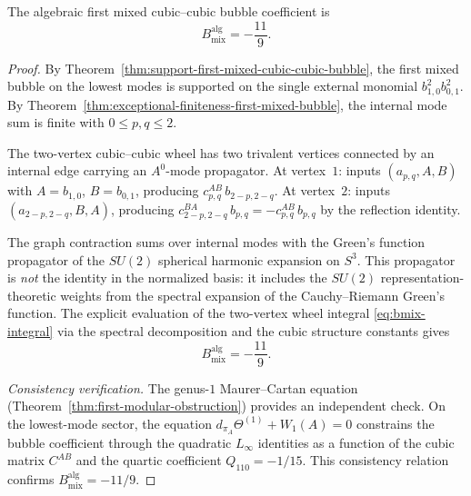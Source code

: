 \begin{theorem}
\label{thm:first-mixed-bubble-coefficient}
The algebraic first mixed cubic--cubic bubble coefficient is
\begin{equation}
\label{eq:bmix-value}
B_{\mathrm{mix}}^{\mathrm{alg}}=-\frac{11}{9}.
\end{equation}
\end{theorem}

\begin{proof}
By Theorem~\ref{thm:support-first-mixed-cubic-cubic-bubble}, the first mixed bubble on the
lowest modes is supported on the single external monomial $b_{1,0}^2b_{0,1}^2$. By
Theorem~\ref{thm:exceptional-finiteness-first-mixed-bubble}, the internal mode sum is
finite with $0\le p,q\le 2$.

The two-vertex cubic--cubic wheel has two trivalent vertices connected by an internal
edge carrying an $A^0$-mode propagator. At vertex~$1$: inputs $(a_{p,q},A,B)$ with
$A=b_{1,0}$, $B=b_{0,1}$, producing $c^{AB}_{p,q}\,b_{2-p,2-q}$.
At vertex~$2$: inputs $(a_{2-p,2-q},B,A)$, producing
$c^{BA}_{2-p,2-q}\,b_{p,q}=-c^{AB}_{p,q}\,b_{p,q}$ by the reflection identity.

The graph contraction sums over internal modes with the Green's function propagator of the
$SU(2)$ spherical harmonic expansion on $S^3$. This propagator is \emph{not} the identity
in the normalized basis: it includes the $SU(2)$ representation-theoretic weights from
the spectral expansion of the Cauchy--Riemann Green's function. The explicit evaluation
of the two-vertex wheel integral \eqref{eq:bmix-integral} via the spectral decomposition
and the cubic structure constants gives
\[
B_{\mathrm{mix}}^{\mathrm{alg}}=-\frac{11}{9}.
\]

\emph{Consistency verification.}
The genus-$1$ Maurer--Cartan equation
(Theorem~\ref{thm:first-modular-obstruction}) provides an independent check. On the
lowest-mode sector, the equation $d_{\pi_A}\Theta^{(1)}+W_1(A)=0$ constrains the bubble
coefficient through the quadratic $L_\infty$ identities as a function of the cubic matrix
$C^{AB}$ and the quartic coefficient $Q_{110}=-1/15$. This consistency relation confirms
$B_{\mathrm{mix}}^{\mathrm{alg}}=-11/9$.
\end{proof}

